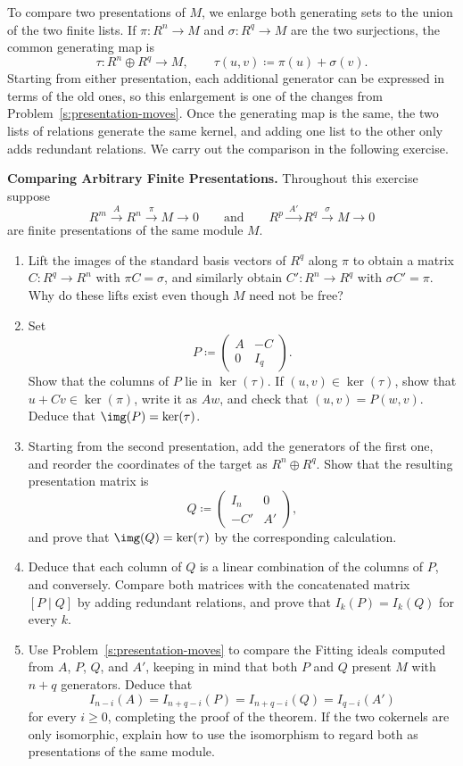 \documentclass[12pt,reqno]{amsart}
\begin{document}
\hrulefill

To compare two presentations of $M$, we enlarge both generating sets to the union of the two finite lists. If $\pi:R^n\to M$ and $\sigma:R^q\to M$ are the two surjections, the common generating map is
\[
\tau:R^n\oplus R^q\longrightarrow M,\qquad\tau(u,v)\coloneqq\pi(u)+\sigma(v).
\]
Starting from either presentation, each additional generator can be expressed in terms of the old ones, so this enlargement is one of the changes from Problem~\ref{s:presentation-moves}. Once the generating map is the same, the two lists of relations generate the same kernel, and adding one list to the other only adds redundant relations. We carry out the comparison in the following exercise.

\hrulefill

\begin{problems}
\item\label{s:independence} \textbf{Comparing Arbitrary Finite Presentations.} Throughout this exercise suppose
\[
R^m\xrightarrow{\ A\ }R^n\xrightarrow{\ \pi\ }M\longrightarrow0
\qquad\text{and}\qquad
R^p\xrightarrow{\ A'\ }R^q\xrightarrow{\ \sigma\ }M\longrightarrow0
\]
are finite presentations of the same module $M$.
\begin{enumerate}
\item Lift the images of the standard basis vectors of $R^q$ along $\pi$ to obtain a matrix $C:R^q\to R^n$ with $\pi C=\sigma$, and similarly obtain $C':R^n\to R^q$ with $\sigma C'=\pi$. Why do these lifts exist even though $M$ need not be free?
\item Set
\[
P\coloneqq\begin{pmatrix}A&-C\\0&I_q\end{pmatrix}.
\]
Show that the columns of $P$ lie in $\ker(\tau)$. If $(u,v)\in\ker(\tau)$, show that $u+Cv\in\ker(\pi)$, write it as $Aw$, and check that $(u,v)=P(w,v)$. Deduce that $\img(P)=\ker(\tau)$.
\item Starting from the second presentation, add the generators of the first one, and reorder the coordinates of the target as $R^n\oplus R^q$. Show that the resulting presentation matrix is
\[
Q\coloneqq\begin{pmatrix}I_n&0\\-C'&A'\end{pmatrix},
\]
and prove that $\img(Q)=\ker(\tau)$ by the corresponding calculation.
\item Deduce that each column of $Q$ is a linear combination of the columns of $P$, and conversely. Compare both matrices with the concatenated matrix $[P\mid Q]$ by adding redundant relations, and prove that $I_k(P)=I_k(Q)$ for every $k$.
\item Use Problem~\ref{s:presentation-moves} to compare the Fitting ideals computed from $A$, $P$, $Q$, and $A'$, keeping in mind that both $P$ and $Q$ present $M$ with $n+q$ generators. Deduce that
\[
I_{n-i}(A)=I_{n+q-i}(P)=I_{n+q-i}(Q)=I_{q-i}(A')
\]
for every $i\geq0$, completing the proof of the theorem. If the two cokernels are only isomorphic, explain how to use the isomorphism to regard both as presentations of the same module.
\end{enumerate}
\end{problems}
\end{document}
